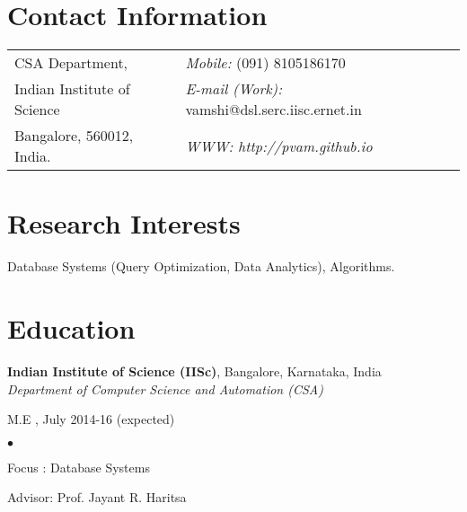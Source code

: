\documentclass[margin,line]{res}
\newenvironment{list1}{
  \begin{list}{\ding{113}}{%
      \setlength{\itemsep}{0in}
      \setlength{\parsep}{0in} \setlength{\parskip}{0in}
      \setlength{\topsep}{0in} \setlength{\partopsep}{0in} 
      \setlength{\leftmargin}{0.17in}}}{\end{list}}
\newenvironment{list2}{
  \begin{list}{$\bullet$}{%
      \setlength{\itemsep}{0in}
      \setlength{\parsep}{0in} \setlength{\parskip}{0in}
      \setlength{\topsep}{0in} \setlength{\partopsep}{0in} 
      \setlength{\leftmargin}{0.2in}}}{\end{list}}
\begin{document}

\begin{resume}
\section{\sc Contact Information}
\vspace{.05in}
\begin{tabular}{@{}p{3in}p{4in}}
CSA Department,             & {\it Mobile:}  (091) 8105186170 \\            
Indian Institute of Science & {\it E-mail (Work):}  vamshi@dsl.serc.iisc.ernet.in\\       
Bangalore, 560012, India.  & {\it WWW: http://pvam.github.io} \\     
\end{tabular}


\section{\sc Research Interests}

Database Systems (Query Optimization, Data Analytics), Algorithms.

\section{\sc Education}
{\bf Indian Institute of Science (IISc)}, Bangalore, Karnataka, India\\
{\em Department of Computer Science and Automation (CSA)} 
\begin{list1}
\item[]  M.E , July 2014-16 (expected)
\begin{list2}
\vspace*{.05in}
%
\item Focus : Database Systems
\item Advisor:  Prof. Jayant R. Haritsa
\end{list2}
\end{list1}


\end{resume}
\end{document}
